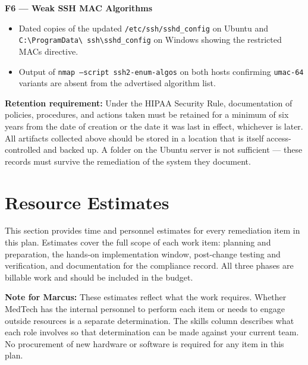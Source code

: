 \documentclass[12pt]{article}
\begin{document}
\bigskip
 
\noindent\textbf{F6 --- Weak SSH MAC Algorithms}
 
\begin{itemize}[leftmargin=1.5em, itemsep=4pt]
  \item Dated copies of the updated \texttt{/etc/ssh/sshd\_config} on
    Ubuntu and \texttt{C:\textbackslash ProgramData\textbackslash
    ssh\textbackslash sshd\_config} on Windows showing the restricted
    MACs directive.
  \item Output of \texttt{nmap --script ssh2-enum-algos} on both hosts
    confirming \texttt{umac-64} variants are absent from the advertised
    algorithm list.
\end{itemize}
 
\bigskip
 
\begin{warnbox}
\textbf{Retention requirement:} Under the HIPAA Security Rule, documentation
of policies, procedures, and actions taken must be retained for a minimum of
six years from the date of creation or the date it was last in effect,
whichever is later. All artifacts collected above should be stored in a
location that is itself access-controlled and backed up. A folder on the
Ubuntu server is not sufficient --- these records must survive the remediation
of the system they document.
\end{warnbox}

\section{Resource Estimates}
This section provides time and personnel estimates for every remediation item
in this plan. Estimates cover the full scope of each work item: planning and
preparation, the hands-on implementation window, post-change testing and
verification, and documentation for the compliance record. All three phases
are billable work and should be included in the budget.
 
\begin{notebox}
\textbf{Note for Marcus:} These estimates reflect what the work requires.
Whether MedTech has the internal personnel to perform each item or needs to
engage outside resources is a separate determination. The skills column
describes what each role involves so that determination can be made against
your current team. No procurement of new hardware or software is required
for any item in this plan.
\end{notebox}
 
\end{document}
